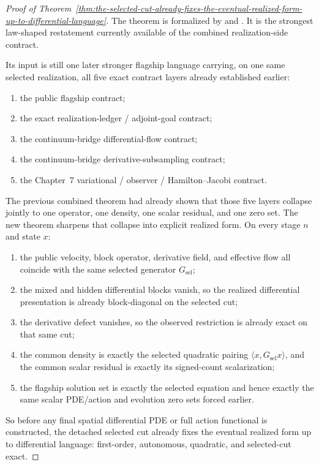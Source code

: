 \begin{proof}[Proof of Theorem~\ref{thm:the-selected-cut-already-fixes-the-eventual-realized-form-up-to-differential-language}]
\label{proof:thm:the-selected-cut-already-fixes-the-eventual-realized-form-up-to-differential-language}
The theorem is formalized by
 and
. It is
the strongest law-shaped restatement currently available of the combined
realization-side contract.

Its input is still one later stronger flagship language carrying, on one same
selected realization, all five exact contract layers already established
earlier:
\begin{enumerate}
\item the public flagship contract;
\item the exact realization-ledger / adjoint-goal contract;
\item the continuum-bridge differential-flow contract;
\item the continuum-bridge derivative-subsampling contract;
\item the Chapter~7 variational / observer / Hamilton--Jacobi contract.
\end{enumerate}
The previous combined theorem had already shown that those five layers collapse
jointly to one operator, one density, one scalar residual, and one zero set.
The new theorem sharpens that collapse into explicit realized form. On every
stage \(n\) and state \(x\):
\begin{enumerate}
\item the public velocity, block operator, derivative field, and effective
      flow all coincide with the same selected generator \(G_{\mathrm{sel}}\);
\item the mixed and hidden differential blocks vanish, so the realized
      differential presentation is already block-diagonal on the selected cut;
\item the derivative defect vanishes, so the observed restriction is already
      exact on that same cut;
\item the common density is exactly the selected quadratic pairing
      \(\langle x,G_{\mathrm{sel}}x\rangle\), and the common scalar residual is
      exactly its signed-count scalarization;
\item the flagship solution set is exactly the selected equation and hence
      exactly the same scalar PDE/action and evolution zero sets forced
      earlier.
\end{enumerate}
So before any final spatial differential PDE or full action functional is
constructed, the detached selected cut already fixes the eventual realized form
up to differential language: first-order, autonomous, quadratic, and
selected-cut exact.
\end{proof}

